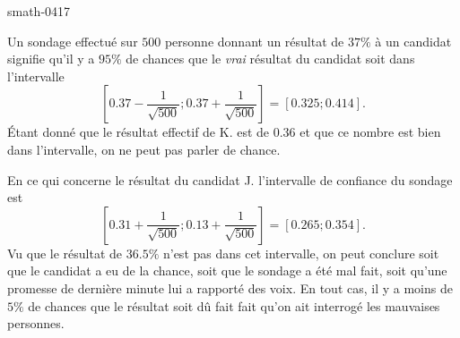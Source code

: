 
\begin{corrige}{smath-0417}

    Un sondage effectué sur \( 500\) personne donnant un résultat de \( 37\%\) à un candidat signifie qu'il y a \( 95\%\) de chances que le \emph{vrai} résultat du candidat soit dans l'intervalle
    \begin{equation}
        \left[ 0.37-\frac{1}{ \sqrt{500} };0.37+\frac{1}{ \sqrt{500} } \right]=[0.325;0.414].
    \end{equation}
    Étant donné que le résultat effectif de K. est de \( 0.36\) et que ce nombre est bien dans l'intervalle, on ne peut pas parler de chance.

    En ce qui concerne le résultat du candidat J. l'intervalle de confiance du sondage est
    \begin{equation}
        \left[ 0.31+\frac{1}{ \sqrt{500} };0.13+\frac{1}{ \sqrt{500} } \right]=[0.265;0.354].
    \end{equation}
    Vu que le résultat de \( 36.5\%\) n'est pas dans cet intervalle, on peut conclure soit que le candidat a eu de la chance, soit que le sondage a été mal fait, soit qu'une promesse de dernière minute lui a rapporté des voix. En tout cas, il y a moins de \( 5\%\) de chances que le résultat soit dû fait fait qu'on ait interrogé les mauvaises personnes.

\end{corrige}
